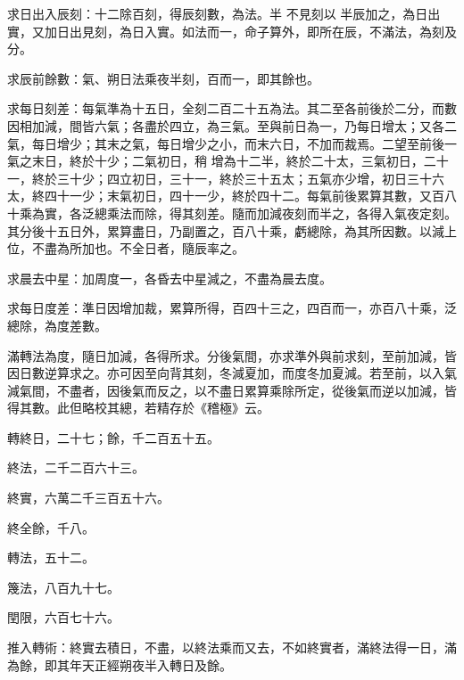 \begin{pinyinscope}
 求日出入辰刻：十二除百刻，得辰刻數，為法。半
 不見刻以
 半辰加之，為日出實，又加日出見刻，為日入實。如法而一，命子算外，即所在辰，不滿法，為刻及分。



 求辰前餘數：氣、朔日法乘夜半刻，百而一，即其餘也。



 求每日刻差：每氣準為十五日，全刻二百二十五為法。其二至各前後於二分，而數因相加減，間皆六氣；各盡於四立，為三氣。至與前日為一，乃每日增太；又各二氣，每日增少；其末之氣，每日增少之小，而末六日，不加而裁焉。二望至前後一氣之末日，終於十少；二氣初日，稍
 增為十二半，終於二十太，三氣初日，二十一，終於三十少；四立初日，三十一，終於三十五太；五氣亦少增，初日三十六太，終四十一少；末氣初日，四十一少，終於四十二。每氣前後累算其數，又百八十乘為實，各泛總乘法而除，得其刻差。隨而加減夜刻而半之，各得入氣夜定刻。其分後十五日外，累算盡日，乃副置之，百八十乘，虧總除，為其所因數。以減上位，不盡為所加也。不全日者，隨辰率之。



 求晨去中星：加周度一，各昏去中星減之，不盡為晨去度。



 求每日度差：準日因增加裁，累算所得，百四十三之，四百而一，亦百八十乘，泛總除，為度差數。



 滿轉法為度，隨日加減，各得所求。分後氣間，亦求準外與前求刻，至前加減，皆因日數逆算求之。亦可因至向背其刻，冬減夏加，而度冬加夏減。若至前，以入氣減氣間，不盡者，因後氣而反之，以不盡日累算乘除所定，從後氣而逆以加減，皆得其數。此但略校其總，若精存於《稽極》云。



 轉終日，二十七；餘，千二百五十五。



 終法，二千二百六十三。



 終實，六萬二千三百五十六。



 終全餘，千八。



 轉法，五十二。



 篾法，八百九十七。



 閏限，六百七十六。



 推入轉術：終實去積日，不盡，以終法乘而又去，不如終實者，滿終法得一日，滿為餘，即其年天正經朔夜半入轉日及餘。




\end{pinyinscope}
